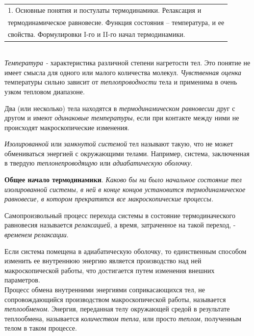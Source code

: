 \documentclass[14pt,a4paper]{scrartcl}
\begin{document}
		\begin{tabular}[t]{|l|} 
		\hline
		1. Основные понятия и постулаты термодинамики. Релаксация и\\
		термодинамическое равновесие. Функция состояния – температура, и ее \\
		свойства. Формулировки I-го и II-го начал термодинамики.\\
		\hline
		\end{tabular}\\
	
		\quad  \textit{Температура - } характеристика различной степени нагретости тел.  Это понятие не имеет смысла для одного или малого количества молекул. \textit{Чувственная оценка} температуры сильно зависит от \textit{теплопроводности} тела и применима в очень узком тепловом диапазоне.
		
		\quad Два (или несколько) тела находятся в \textit{термодинамическом равновесии} друг с другом и имеют \textit{одинаковые температуры}, если при контакте между ними не происходят макроскопические изменения.
		
		\quad \textit{Изолированной} или \textit{замкнутой системой} тел называют такую, что не может обмениваться энергией с окружающими телами. Например, система, заключенная в твердую \textit{теплонепроводящую} или \textit{адиабатическую оболочку}.
		
		\quad \textbf{Общее начало термодинамики}. \textit{Каково бы ни было начальное состояние тел изолированной системы, в ней в конце концов установится термодинамическое равновесие, в котором прекратятся все макроскопические процессы.}
		
		\quad Самопроизвольный процесс перехода системы в состояние термодиначеского равновесия называется \textit{релаксацией}, а время, затраченное на такой переход, - \textit{временем релаксации}.
		
		
		
		\quad Если система помещена в адиабатическую оболочку, то единственным способом изменить ее внутреннюю энергию является производство над ней макроскопической работы, что достигается путем изменения внешних параметров.\\
		
		\quad Процесс обмена внутренними энергиями соприкасающихся тел, не сопровождающийся производством макроскопической работы, называется \textit{теплообменом}. Энергия, переданная телу окружающей средой в результате теплообмена, называется \textit{количеством тепла}, или просто \textit{теплом}, полученным телом в таком процессе.
		
\end{document}
